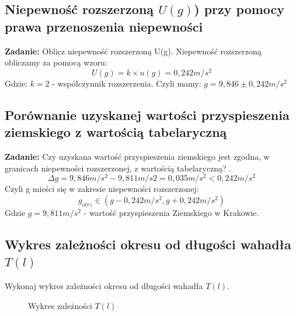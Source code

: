 \documentclass[18pt, twoside]{article}
\begin{document}
	\subsection{Niepewność rozszerzoną \(U(g)\)) przy pomocy prawa przenoszenia niepewności}
	\textbf{Zadanie:} Oblicz niepewność rozszerzoną U(g).\newline
	Niepewność rozszerzoną obliczamy za pomocą wzoru:
	\[U(g) = k \times u(g) = 0,242 m/s^2\]
	Gdzie:  \( k = 2\) - współczynnik rozszerzenia.
	Czyli mamy: \(g = 9,846 \pm  0,242 m/s^2\)
		
	\subsection{Porównanie uzyskanej wartości przyspieszenia ziemskiego z wartością tabelaryczną}
	\textbf{Zadanie:} Czy uzyskana wartość przyspieszenia ziemskiego jest zgodna, w granicach niepewności rozszerzonej, z wartością tabelaryczną? . \newline
	\[\Delta g = 9,846 m/s^2 - 9,811 m/s2= 0,035 m/s^2 < 0,242 m/s^2\] Czyli g mieści się w zakresie niepewności rozszerzonej:
	\[g_{otrz} \in (g-0,242m/s^2 , g+0,242m/s^2)\] Gdzie \(g=9,811 m/s^2\) - wartość przyspieszenia Ziemskiego w Krakowie.
	
	
	\break
	\break
	\break
	\break
	\subsection{Wykres zależności okresu od długości wahadła \(T(l)\)}
	Wykonaj wykres zależności okresu od długości wahadła \(T(l)\).

	
	
	\begin{figure}[h!]
		\caption{Wykres zależności \(T(l)\)}
	\end{figure}
	
\end{document}
